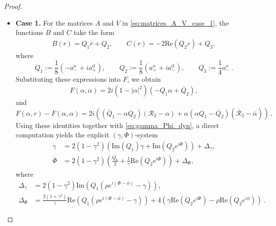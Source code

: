 \documentclass[10pt]{article}
\theoremstyle{definition}
\theoremstyle{definition}
\numberwithin{equation}{section}
\newcommand{\CR}{\mathcal{R}}
\newcommand{\im}[1]{\mathrm{Im} \left(#1\right)}
\newcommand{\re}[1]{\mathrm{Re}\left(#1\right)}
\newcommand{\alphaBar}{\overline{\alpha}}
\newcommand{\aDPlus}{a_+^{\text{d}}}
\newcommand{\aDMinus}{a_-^{\text{d}}}
\newcommand{\aOPlus}{a_+^{\text{o}}}
\newcommand{\aOMinus}{a_-^{\text{o}}}
\newcommand{\Dgamma}{\Dot{\gamma}}
\newcommand{\rOverline}{\overline{r}}
\newcommand{\DeltaGamma}{\Delta_{\gamma}}
\newcommand{\DeltaPhi}{\Delta_{\Phi}}
\begin{document}
\begin{proof}
\begin{itemize}
    \item \textbf{Case 1.}
    For the matrices $A$ and $V$ in \eqref{eq:matrices_A_V_case_1}, the functions $B$ and $C$ take the form
    \begin{equation*}
    \begin{aligned}
    B(r) = Q_1 \rOverline + Q_2, \qquad C(r) = -2 \re{Q_2 r} + Q_3,
    \end{aligned}
    \end{equation*}
    where
    \begin{equation*}
    Q_1 := \frac{1}{8} \left( - \aOMinus + i\aDPlus \right), \qquad Q_2 := \frac{1}{8} \left( \aOPlus + i \aDMinus \right), \qquad Q_3 := \frac{1}{4} a_{-}^o \, .
    \end{equation*}
    Substituting these expressions into $F$, we obtain
    \begin{equation*}
    F(\alpha, \alpha) = 2i (1 - |\alpha|^2) \left( -Q_1 \alpha + \overline{Q}_2 \right), 
    \end{equation*}
    and
    \begin{equation*}
    F(\alpha, r) - F(\alpha, \alpha) = 2i \left( \left( \overline{Q}_1 - \alpha Q_2 \right) \left( \CR_2 - \alpha \right) + \alpha\left(\alpha Q_1 - \overline{Q}_2 \right) \left( \overline{\CR}_2 - \alphaBar \right) \right) \, .
    \end{equation*}
    Using these identities together with \eqref{eq:gamma_Phi_dyn}, a direct computation yields the explicit $(\gamma,\Phi)$-system
    \begin{equation}\label{eq:WS_pc_dyn_case_1}
    \begin{aligned}
        \Dgamma &= 2(1 - \gamma^2) \left(  \im{Q_1} \gamma + \im{Q_2 e^{i\Phi}} \right) + \DeltaGamma,\\[4pt]
    \dot{\Phi} &= 2(1-\gamma^2) \left( \frac{Q_3}{2} + \frac{1}{\gamma} \re{Q_2 e^{i\Phi}} \right) + \DeltaPhi,
    \end{aligned}
    \end{equation}
    where
    \begin{equation}\label{eq:Delta_gamma_Phi_case1}
    \begin{aligned}
    \DeltaGamma &= 2(1-\gamma^2) \im{Q_1 \left(\rho e^{i(\Phi - \phi)} - \gamma \right)},\\[4pt]
    \DeltaPhi &= \frac{2(1+\gamma^2)}{\gamma} \re{Q_1 \left( \rho e^{i(\Phi - \phi)} - \gamma \right)} + 4 \left( \gamma \re{Q_2 e^{i\Phi}} - \rho \re{Q_2 e^{i\phi}} \right) \, .
    \end{aligned}
    \end{equation}
    

\end{itemize}
\end{proof}
\end{document}
